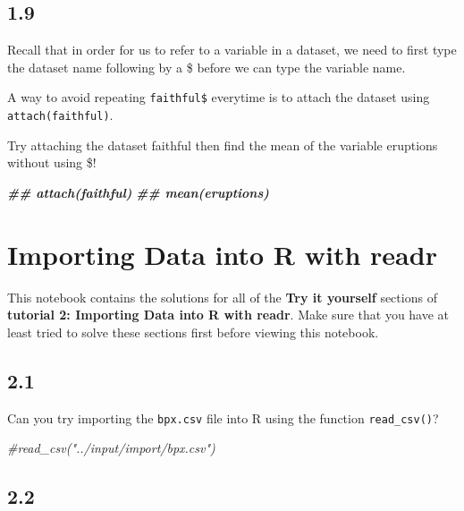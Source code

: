 \documentclass[
]{book}
\newenvironment{Shaded}{\begin{snugshade}}{\end{snugshade}}
\newcommand{\CommentTok}[1]{\textcolor[rgb]{0.56,0.35,0.01}{\textit{#1}}}
\newcommand{\DocumentationTok}[1]{\textcolor[rgb]{0.56,0.35,0.01}{\textbf{\textit{#1}}}}
\begin{document}
\hypertarget{section-8}{%
\subsection{1.9}\label{section-8}}

Recall that in order for us to refer to a variable in a dataset, we need to first type the dataset name following by a \$ before we can type the variable name.

A way to avoid repeating \texttt{faithful\$} everytime is to attach the dataset using \texttt{attach(faithful)}.

Try attaching the dataset faithful then find the mean of the variable eruptions without using \$!

\begin{Shaded}
\begin{Highlighting}[]
\DocumentationTok{\#\# attach(faithful)}
\DocumentationTok{\#\# mean(eruptions)}
\end{Highlighting}
\end{Shaded}

\hypertarget{importing-data-into-r-with-readr-1}{%
\section{Importing Data into R with readr}\label{importing-data-into-r-with-readr-1}}

This notebook contains the solutions for all of the \textbf{Try it yourself} sections of \textbf{tutorial 2: Importing Data into R with readr}. Make sure that you have at least tried to solve these sections first before viewing this notebook.

\hypertarget{section-9}{%
\subsection{2.1}\label{section-9}}

Can you try importing the \texttt{bpx.csv} file into R using the function \texttt{read\_csv()}?

\begin{Shaded}
\begin{Highlighting}[]
\CommentTok{\#read\_csv("../input/import/bpx.csv")}
\end{Highlighting}
\end{Shaded}

\hypertarget{section-10}{%
\subsection{2.2}\label{section-10}}
\end{document}
